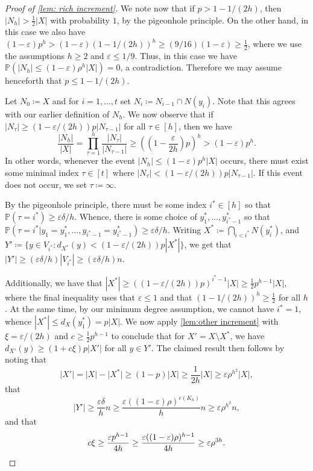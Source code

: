 \documentclass{aic}
\theoremstyle{plain}
\theoremstyle{remark}
\newcommand{\eps}{\ensuremath{\varepsilon}}
\newcommand\ab[1]{\lvert #1 \rvert}
\renewcommand{\P}{\mathbb{P}}
\begin{document}
\begin{proof}[Proof of \cref{lem: rich increment}]
We note now that if $p > 1-1/(2h)$, then $\ab{N_h} > \frac 12 \ab X$ with probability $1$, by the pigeonhole principle. On the other hand, in this case we also have $(1-\eps)p^h > (1-\eps)(1-1/(2h))^h \geq (9/16)(1-\eps)\geq\frac 12$, where we use the assumptions $h \geq 2$ and $\eps \leq 1/9$. Thus, in this case we have $\P(\ab{N_h} \leq (1-\eps) \rho^h \ab X) = 0$, a contradiction. Therefore we may assume henceforth that $p \leq 1-1/(2h)$.

Let $N_0\coloneqq X$ and for $i =1,\dots ,t$ set $N_i\coloneqq N_{i-1}\cap N(y_i)$. Note that this agrees with our earlier definition of $N_h$. We now observe that if $\ab{N_\tau} \geq (1-\eps/(2h)) p \ab{N_{\tau-1}}$ for all $\tau \in [h]$, then we have
\[
\frac{\ab{N_h}}{\ab X} = \prod_{\tau=1}^h \frac{\ab{N_\tau}}{\ab{N_{\tau-1}}} \geq \left( \left( 1- \frac{\eps}{2h}\right) p\right)^h > (1-\eps) p^h.
\]
In other words, whenever the event $\ab{N_h}\leq (1-\eps)p^h \ab X$ occurs, there 
must exist some minimal index $\tau\in [t]$ where $|N_\tau|<(1-\eps/(2h))p|N_{\tau-1}|$. If this event does not occur, we set $\tau\coloneqq \infty$.

By the pigeonhole principle, there must be some index $i^*\in [h]$ so that $\P(\tau = i^*)\ge \eps\delta/h$. Whence, there is some choice of $y_1^*,\dots,y_{i^*-1}^*$ so that $\P(\tau = i^*|y_1=y_1^*,\dots,y_{i^*-1}=y_{i^*-1}^*) \ge \eps\delta/h $. Writing $X^*\coloneqq  \bigcap_{i<i^*}N(y_i^*)$, and $Y' \coloneqq  \{y\in V_{i^*}: d_{X^*}(y)<(1-\eps/(2h))p|X^*|\}$, we get that $|Y'| \ge (\eps\delta/h)|V_{i^*}|\ge (\eps \delta/h)n$.

Additionally, we have that $|X^*|\ge ((1-\eps/(2h))p)^{i^*-1}|X|\ge \frac 12 p^{h-1}|X|$, where the final inequality uses that $\eps \leq 1$ and that $(1-1/(2h))^h \geq \frac 12$ for all $h$. At the same time, by our minimum degree assumption, we cannot have $i^*=1$, whence $|X^*|\le d_X(y_1^*) = p|X|$. We now apply \cref{lem:other increment} with $\xi = \eps/(2h)$ and $c \geq \frac 12 p^{h-1}$ to conclude that for $X' = X \setminus X^*$, we have $d_{X'}(y) \geq (1+c\xi)p \ab{X'}$ for all $y \in Y'$. The claimed result then follows by noting that
\[
\ab {X'} = \ab X - \ab{X^*} \geq (1-p)\ab X \geq \frac 1{2h} \ab X \geq \eps \rho^{h^2} \ab X,
\]
that
\[
\ab{Y'} \geq \frac{\eps \delta}{h}n \geq \frac{\eps((1-\eps)\rho)^{e(K_h)}}{h}n \geq \eps \rho^{h^2}n,
\]
and that
\[
c \xi \geq \frac{\eps p^{h-1}}{4h} \geq \frac{\eps((1-\eps)\rho)^{h-1}}{4h} \geq \eps \rho^{3h}.\qedhere
\]
\end{proof}
\end{document}
